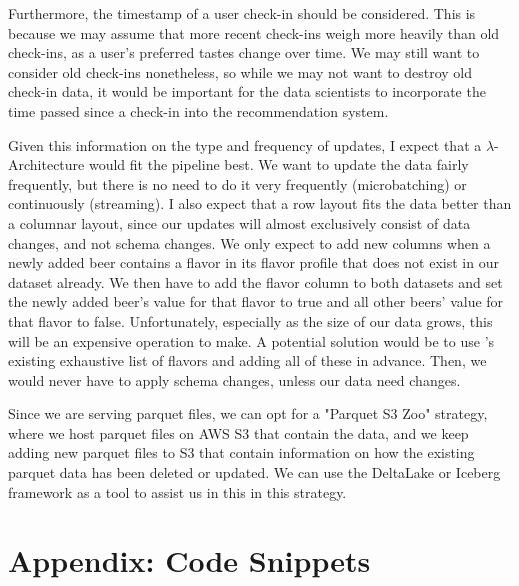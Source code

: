\documentclass[sigconf, natbib=true]{acmart}
\begin{document}
Furthermore, the timestamp of a user check-in should be considered.
This is because we may assume that more recent check-ins weigh more heavily than old check-ins, as a user's preferred tastes change over time.
We may still want to consider old check-ins nonetheless, so while we may not want to destroy old check-in data, it would be important for the data scientists to incorporate the time passed since a check-in into the recommendation system.

Given this information on the type and frequency of updates, I expect that a $\lambda$-Architecture would fit the pipeline best.
We want to update the data fairly frequently, but there is no need to do it very frequently (microbatching) or continuously (streaming).
I also expect that a row layout fits the data better than a columnar layout, since our updates will almost exclusively consist of data changes, and not schema changes.
We only expect to add new columns when a newly added beer contains a flavor in its flavor profile that does not exist in our dataset already.
We then have to add the flavor column to both datasets and set the newly added beer's value for that flavor to true and all other beers' value for that flavor to false.
Unfortunately, especially as the size of our data grows, this will be an expensive operation to make.
A potential solution would be to use \citeauthor{untappd}'s existing exhaustive list of flavors and adding all of these in advance.
Then, we would never have to apply schema changes, unless our data need changes.

Since we are serving parquet files, we can opt for a "Parquet S3 Zoo" strategy, where we host parquet files on AWS S3 that contain the data, and we keep adding new parquet files to S3 that contain information on how the existing parquet data has been deleted or updated.
We can use the DeltaLake or Iceberg framework as a tool to assist us in this in this strategy.


\def\bibfont{\small} %
 

\onecolumn
\appendix
\section{Appendix: Code Snippets}
\end{document}
